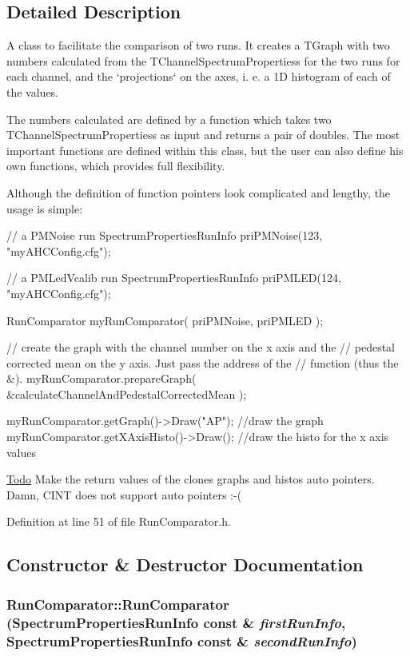 \subsection{Detailed Description}
A class to facilitate the comparison of two runs. It creates a TGraph with two numbers calculated from the TChannelSpectrumPropertiess for the two runs for each channel, and the `projections` on the axes, i. e. a 1D histogram of each of the values.

The numbers calculated are defined by a function which takes two TChannelSpectrumPropertiess as input and returns a pair of doubles. The most important functions are defined within this class, but the user can also define his own functions, which provides full flexibility.

Although the definition of function pointers look complicated and lengthy, the usage is simple: 
\begin{DoxyCode}
  // a PMNoise run
  SpectrumPropertiesRunInfo priPMNoise(123, "myAHCConfig.cfg");

  // a PMLedVcalib run
  SpectrumPropertiesRunInfo priPMLED(124, "myAHCConfig.cfg");

  RunComparator myRunComparator( priPMNoise, priPMLED );

  // create the graph with the channel number on the x axis and the 
  // pedestal corrected mean on the y axis. Just pass the address of the 
  // function (thus the &).
  myRunComparator.prepareGraph( &calculateChannelAndPedestalCorrectedMean );

  myRunComparator.getGraph()->Draw("AP"); //draw the graph
  myRunComparator.getXAxisHisto()->Draw(); //draw the histo for the x axis values
      
\end{DoxyCode}


\begin{Desc}
\item[\hyperlink{todo__todo000001}{Todo}]Make the return values of the clones graphs and histos auto pointers. Damn, CINT does not support auto pointers :-\/( \end{Desc}


Definition at line 51 of file RunComparator.h.

\subsection{Constructor \& Destructor Documentation}
\hypertarget{class_run_comparator_ad66bf8c2b9402ed2f00f69afcc6e8bd6}{
\subsubsection[{RunComparator}]{\setlength{\rightskip}{0pt plus 5cm}RunComparator::RunComparator ({\bf SpectrumPropertiesRunInfo} const \& {\em firstRunInfo}, \/  {\bf SpectrumPropertiesRunInfo} const \& {\em secondRunInfo})}}
\label{class_run_comparator_ad66bf8c2b9402ed2f00f69afcc6e8bd6}


